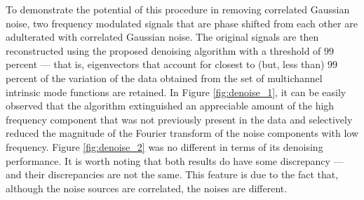 \documentclass[onecolumn, groupedaddress, 10pt]{revtex4-1}
\begin{document}
To demonstrate the potential of this procedure in removing correlated Gaussian noise, two frequency modulated signals that are phase shifted from each other are adulterated with correlated Gaussian noise. The original signals are then reconstructed using the proposed denoising algorithm with a threshold of $99$ percent --- that is, eigenvectors that account for closest to (but, less than) $99$ percent of the variation of the data obtained from the set of multichannel intrinsic mode functions are retained. In Figure \ref{fig:denoise_1}, it can be easily observed that the algorithm extinguished an appreciable amount of the high frequency component that was not previously present in the data and selectively reduced the magnitude of the Fourier transform of the noise components with low frequency. Figure \ref{fig:denoise_2} was no different in terms of its denoising performance. It is worth noting that both results do have some discrepancy --- and their discrepancies are not the same. This feature is due to the fact that, although the noise sources are correlated, the noises are different.
\end{document}
